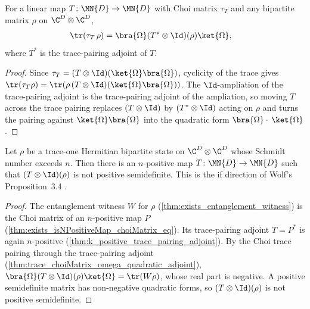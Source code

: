 \begin{theorem}
    \label{thm:trace_choiMatrix_omega_quadratic_adjoint}
    \leanok
    For a linear map $T\colon\MN{D}\to\MN{D}$ with Choi matrix $\tau_T$ and any bipartite
    matrix $\rho$ on $\C^D\otimes\C^D$,
    \begin{align}
        \tr(\tau_T\,\rho)
         & =\bra{\Omega}(T^{*}\otimes\Id)(\rho)\ket{\Omega},
        \notag
    \end{align}
    where $T^{*}$ is the trace-pairing adjoint of $T$.
\end{theorem}

\begin{proof}
    \leanok
    Since $\tau_T=(T\otimes\Id)(\ket{\Omega}\bra{\Omega})$, cyclicity of the trace gives
    $\tr(\tau_T\rho)=\tr(\rho\,(T\otimes\Id)(\ket{\Omega}\bra{\Omega}))$. The
    $\Id$-ampliation of the trace-pairing adjoint is the trace-pairing adjoint of the
    ampliation, so moving $T$ across the trace pairing replaces
    $(T\otimes\Id)$ by $(T^{*}\otimes\Id)$ acting on $\rho$ and turns the pairing against
    $\ket{\Omega}\bra{\Omega}$ into the quadratic form $\bra{\Omega} \cdot\,\ket{\Omega}$.
\end{proof}

\begin{theorem}
    \label{thm:exists_isNPositiveMap_detects}
    \leanok
    Let $\rho$ be a trace-one Hermitian bipartite state on $\C^D\otimes\C^D$ whose Schmidt
    number exceeds $n$. Then there is an $n$-positive map $T\colon\MN{D}\to\MN{D}$ such that
    $(T\otimes\Id)(\rho)$ is not positive semidefinite. This is the if direction of Wolf's
    Proposition~3.4 \cite[Chapter~3, Proposition~3.4]{Wolf2012Quantum}.
\end{theorem}

\begin{proof}
    \leanok
    The entanglement witness $W$ for $\rho$ (\ref{thm:exists_entanglement_witness}) is the
    Choi matrix of an $n$-positive map $P$ (\ref{thm:exists_isNPositiveMap_choiMatrix_eq}).
    Its trace-pairing adjoint $T=P^{*}$ is again $n$-positive
    (\ref{thm:k_positive_trace_pairing_adjoint}). By the Choi trace pairing through the
    trace-pairing adjoint (\ref{thm:trace_choiMatrix_omega_quadratic_adjoint}),
    $\bra{\Omega}(T\otimes\Id)(\rho)\ket{\Omega}=\tr(W\rho)$, whose real part is
    negative. A positive semidefinite matrix has non-negative quadratic forms, so
    $(T\otimes\Id)(\rho)$ is not positive semidefinite.
\end{proof}

